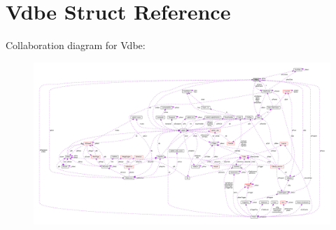 \hypertarget{structVdbe}{}\section{Vdbe Struct Reference}
\label{structVdbe}


Collaboration diagram for Vdbe\+:\nopagebreak
\begin{figure}[H]
\begin{center}
\leavevmode
\includegraphics[width=350pt]{structVdbe__coll__graph}
\end{center}
\end{figure}
